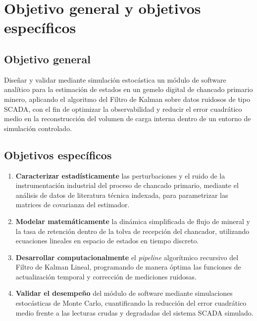 \section{Objetivo general y objetivos específicos}
\label{sec:objetivos}

\subsection{Objetivo general}

Diseñar y validar mediante simulación estocástica un módulo de software
analítico para la estimación de estados en un gemelo digital de chancado
primario minero, aplicando el algoritmo del Filtro de Kalman sobre datos
ruidosos de tipo SCADA, con el fin de optimizar la observabilidad y reducir el
error cuadrático medio en la reconstrucción del volumen de carga interna dentro
de un entorno de simulación controlado.

\subsection{Objetivos específicos}

\begin{enumerate}[label=\textbf{OE\arabic*.},leftmargin=*,itemsep=0.6em]

\item \textbf{Caracterizar estadísticamente} las perturbaciones y el ruido de la
instrumentación industrial del proceso de chancado primario, mediante el
análisis de datos de literatura técnica indexada, para parametrizar las matrices
de covarianza del estimador.

\item \textbf{Modelar matemáticamente} la dinámica simplificada de flujo de
mineral y la tasa de retención dentro de la tolva de recepción del chancador,
utilizando ecuaciones lineales en espacio de estados en tiempo discreto.

\item \textbf{Desarrollar computacionalmente} el \emph{pipeline} algorítmico
recursivo del Filtro de Kalman Lineal, programando de manera óptima las
funciones de actualización temporal y corrección de mediciones ruidosas.

\item \textbf{Validar el desempeño} del módulo de software mediante simulaciones
estocásticas de Monte Carlo, cuantificando la reducción del error cuadrático
medio frente a las lecturas crudas y degradadas del sistema SCADA simulado.

\end{enumerate}

